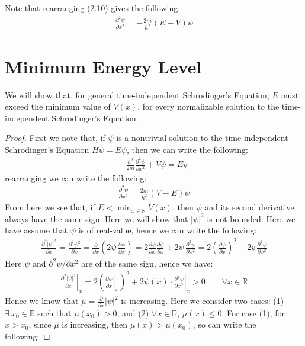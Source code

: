 \documentclass[11pt]{book}
\theoremstyle{break}
\theoremstyle{break}
\newcommand{\R}{\mathbb{R}}
\newcommand{\pd}{\partial}
\begin{document}
Note that rearranging (2.10) gives the following:
\begin{align*}
\frac{\pd^2 \psi}{\pd x^2} = -\frac{2m}{\hbar^2} (E-V)\psi
\end{align*}


\newpage
\section[Minimum Energy Level]{\color{red}Minimum Energy Level\color{black}}
We will show that, for general time-independent Schrodinger's Equation, $E$ must exceed the minimum value of $V(x)$, for every normalizable solution to the time-independent Schrodinger's Equation. 


\begin{proof}
First we note that, if $\psi$ is a nontrivial solution to the time-independent Schrodinger's Equation $H\psi = E\psi$, then we can write the following:
\begin{align*}
-\frac{\hbar^2}{2m}\frac{\pd^2 \psi}{\pd x^2} + V\psi = E\psi
\end{align*}
rearranging we can write the following:
\begin{align*}
\frac{\pd^2 \psi}{\pd x^2} = \frac{2m}{\hbar^2} (V-E)\psi
\end{align*}
From here we see that, if $E < \min_{x \in \R}V(x)$, then $\psi$ and its second derivative always have the same sign. Here we will show that $|\psi|^2$ is not bounded. Here we have assume that $\psi$ is of real-value, hence we can write the following:
\begin{align*}
\frac{\pd^2|\psi|^2}{\pd x} = \frac{\pd^2 \psi^2}{\pd x} = \frac{\pd}{\pd x}\left(2 \psi \, \frac{\pd \psi}{\pd x}\right) = 2\frac{\pd \psi}{\pd x}\frac{\pd \psi}{\pd x} + 2\psi\,\frac{\pd^2 \psi}{\pd x^2} = 2\left( \frac{\pd\psi}{\pd x}\right)^2 + 2\psi \frac{\pd^2 \psi}{\pd x^2}
\end{align*}
Here $\psi$ and $\pd^2 \psi/\pd x^2$ are of the same sign, hence we have:
\begin{align*}
\left.\frac{\pd^2|\psi|^2}{\pd x}\right|_{x} =2\left( \left.\frac{\pd\psi}{\pd x}\right|_{x}\right)^2 + 2\psi(x)\cdot \left.\frac{\pd^2 \psi}{\pd x^2}\right|_x >0 \qquad \forall x \in \R
\end{align*}
Hence we know that $\mu = \frac{\pd}{\pd x}|\psi|^2$ is increasing. Here we consider two cases: (1) $\exists\ x_0 \in \R$ such that $\mu(x_0) >0$, and (2) $\forall x \in \R$, $\mu(x) \leq 0$. For case (1), for $x >x_0$, since $\mu$ is increasing, then $\mu(x) > \mu(x_0)$, so can write the following:

\end{proof}
\end{document}
